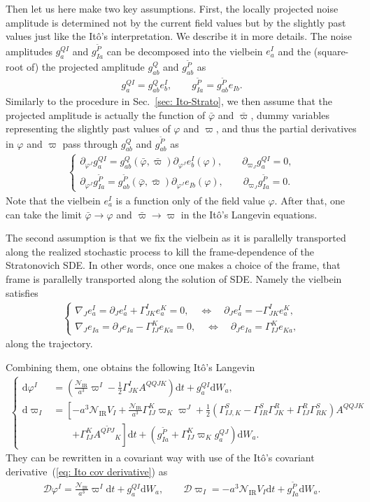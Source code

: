 \documentclass[aps, prd
, preprint
, nofootinbib 
, longbibliography
]{revtex4-1}
\newcommand{\dd}{\mathrm{d}}
\newcommand{\IR}{\mathrm{IR}}
\newcommand{\dps}{\displaystyle}
\newcommand{\calD}{\mathcal{D}}
\newcommand{\calN}{\mathcal{N}}
\newcommand{\bae}[1]{\begin{align} #1 \end{align}}
\newcommand{\bce}[1]{\begin{cases} #1 \end{cases}}
\begin{document}
Then let us here make two key assumptions.
First, the locally projected noise amplitude is determined not by the current field values but by the slightly past values just like the It\^o's interpretation.
We describe it in more details. The noise amplitudes $g^{QI}_a$ and $g^{\tilde{P}}_{Ia}$ can be decomposed into the vielbein $e^I_a$ and the (square-root of) the projected amplitude $g^Q_{ab}$ and $g^{\tilde{P}}_{ab}$ as
\bae{
    g^{QI}_a=g^Q_{ab}e^I_b, \qquad g^{\tilde{P}}_{Ia}=g^{\tilde{P}}_{ab}e_{Ib}.
}
Similarly to the procedure in Sec.~\ref{sec: Ito-Strato},
we then assume that the projected amplitude is actually the function of $\bar{\varphi}$ and $\bar{\varpi}$, dummy variables representing the slightly past values of $\varphi$ and $\varpi$, and thus the partial derivatives in $\varphi$ and $\varpi$ pass through $g^Q_{ab}$ and $g^{\tilde{P}}_{ab}$ as
\bae{
    \bce{
        \dps
        \partial_{\varphi^J}g^{QI}_a=g^Q_{ab}(\bar{\varphi},\bar{\varpi})\partial_{\varphi^J}e^I_b(\varphi), \qquad
        \partial_{\varpi_J}g^{QI}_a=0, \\
        \partial_{\varphi^J}g^{\tilde{P}}_{Ia}=g^{\tilde{P}}_{ab}(\bar{\varphi},\bar{\varpi})\partial_{\varphi^J}e_{Ib}(\varphi), \qquad \partial_{\varpi_J}g^{\tilde{P}}_{Ia}=0.
    }
}
Note that the vielbein $e^I_a$ is a function only of the field value $\varphi$.
After that, one can take the limit $\bar{\varphi}\to\varphi$ and $\bar{\varpi}\to\varpi$ in the It\^o's Langevin equations.

The second assumption is that we fix the vielbein as it is parallelly transported along the realized stochastic process to kill the frame-dependence of the Stratonovich SDE.
In other words, once one makes a choice of the frame, that frame is parallelly transported along the solution of SDE.
Namely the vielbein satisfies
\bae{
    \bce{
        \dps
        \nabla_Je^I_a=\partial_Je^I_a+\Gamma^I_{JK}e^K_a=0, \quad \Leftrightarrow \quad \partial_Je^I_a=-\Gamma^I_{JK}e^K_a, \\
        \dps
        \nabla_Je_{Ia}=\partial_Je_{Ia}-\Gamma_{IJ}^Ke_{Ka}=0, \quad \Leftrightarrow \quad \partial_Je_{Ia}=\Gamma_{IJ}^Ke_{Ka},
    }
}
along the trajectory.

Combining them, one obtains the following It\^o's Langevin
\bae{
    \bce{
        \dps
        \dd\varphi^I & 
        \dps
        =\left(\frac{\calN_\IR}{a^3}\varpi^I-\frac{1}{2}\Gamma^I_{JK}A^{QQJK}\right)\dd t+g^{QI}_a\dd W_a,\\
        \dps
        \dd\varpi_I & 
        \dps
        =\left[-a^3\calN_\IR V_I+\frac{\calN_\IR}{a^3}\Gamma^K_{IJ}\varpi_K\varpi^J+\frac{1}{2}\left(\Gamma^S_{IJ,K}-\Gamma^S_{IR}\Gamma^R_{JK}+\Gamma^R_{IJ}\Gamma^S_{RK}\right)A^{QQJK}\right. \\
        &\dps\qquad
        \left.+\Gamma_{IJ}^KA^{Q\tilde{P}J}{}_K\right]\dd t+\left(g^{\tilde{P}}_{Ia}+\Gamma_{IJ}^K\varpi_Kg^{QJ}_a\right)\dd W_a.
    }
}
They can be rewritten in a covariant way with use of the It\^o's covariant derivative~(\ref{eq: Ito cov derivative}) as
\bae{
    \calD\varphi^I=\frac{\calN_\IR}{a^3}\varpi^I\dd t+g^{QI}_a\dd W_a, \qquad \calD\varpi_I=-a^3\calN_\IR V_I\dd t+g^{\tilde{P}}_{Ia}\dd W_a.
}
\end{document}
